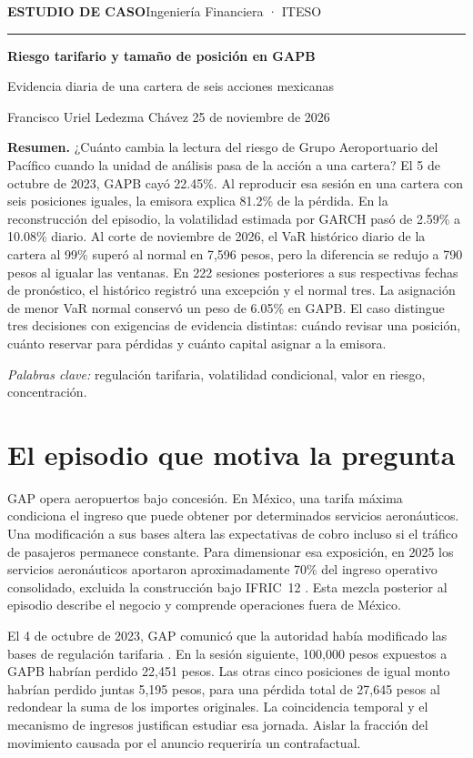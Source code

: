 \documentclass[11pt,letterpaper]{article}
\begin{document}
{\small\color{teal}\textbf{ESTUDIO DE CASO}\hfill Ingeniería Financiera · ITESO}\par
\rule{\linewidth}{0.5pt}\par
{\LARGE\bfseries Riesgo tarifario y tamaño de posición en GAPB}\par
{\large Evidencia diaria de una cartera de seis acciones mexicanas}\par
Francisco Uriel Ledezma Chávez \hfill 25 de noviembre de 2026

\textbf{Resumen.} ¿Cuánto cambia la lectura del riesgo de Grupo Aeroportuario del Pacífico cuando la unidad de análisis pasa de la acción a una cartera? El 5 de octubre de 2023, GAPB cayó 22.45\%. Al reproducir esa sesión en una cartera con seis posiciones iguales, la emisora explica 81.2\% de la pérdida. En la reconstrucción del episodio, la volatilidad estimada por GARCH pasó de 2.59\% a 10.08\% diario. Al corte de noviembre de 2026, el VaR histórico diario de la cartera al 99\% superó al normal en 7,596 pesos, pero la diferencia se redujo a 790 pesos al igualar las ventanas. En 222 sesiones posteriores a sus respectivas fechas de pronóstico, el histórico registró una excepción y el normal tres. La asignación de menor VaR normal conservó un peso de 6.05\% en GAPB. El caso distingue tres decisiones con exigencias de evidencia distintas: cuándo revisar una posición, cuánto reservar para pérdidas y cuánto capital asignar a la emisora.

\textit{Palabras clave:} regulación tarifaria, volatilidad condicional, valor en riesgo, concentración.
\section{El episodio que motiva la pregunta}
GAP opera aeropuertos bajo concesión. En México, una tarifa máxima condiciona el ingreso que puede obtener por determinados servicios aeronáuticos. Una modificación a sus bases altera las expectativas de cobro incluso si el tráfico de pasajeros permanece constante. Para dimensionar esa exposición, en 2025 los servicios aeronáuticos aportaron aproximadamente 70\% del ingreso operativo consolidado, excluida la construcción bajo IFRIC~12 \cite{proyecto}. Esta mezcla posterior al episodio describe el negocio y comprende operaciones fuera de México.

El 4 de octubre de 2023, GAP comunicó que la autoridad había modificado las bases de regulación tarifaria \cite{gap}. En la sesión siguiente, 100,000 pesos expuestos a GAPB habrían perdido 22,451 pesos. Las otras cinco posiciones de igual monto habrían perdido juntas 5,195 pesos, para una pérdida total de 27,645 pesos al redondear la suma de los importes originales. La coincidencia temporal y el mecanismo de ingresos justifican estudiar esa jornada. Aislar la fracción del movimiento causada por el anuncio requeriría un contrafactual.
\end{document}
